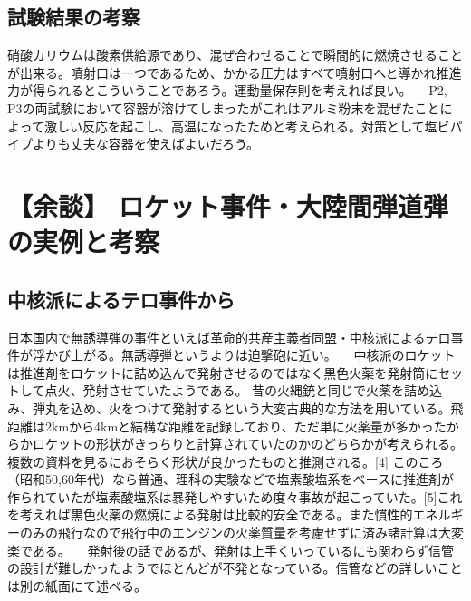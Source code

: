 \subsection{試験結果の考察}
硝酸カリウムは酸素供給源であり、混ぜ合わせることで瞬間的に燃焼させることが出来る。噴射口は一つであるため、かかる圧力はすべて噴射口へと導かれ推進力が得られるとこういうことであろう。運動量保存則を考えれば良い。
　P2, P3の両試験において容器が溶けてしまったがこれはアルミ粉末を混ぜたことによって激しい反応を起こし、高温になったためと考えられる。対策として塩ビパイプよりも丈夫な容器を使えばよいだろう。

\section{ 【余談】 ロケット事件・大陸間弾道弾の実例と考察}
\subsection{中核派によるテロ事件から}
日本国内で無誘導弾の事件といえば革命的共産主義者同盟・中核派によるテロ事件が浮かび上がる。無誘導弾というよりは迫撃砲に近い。
　中核派のロケットは推進剤をロケットに詰め込んで発射させるのではなく黒色火薬を発射筒にセットして点火、発射させていたようである。
昔の火縄銃と同じで火薬を詰め込み、弾丸を込め、火をつけて発射するという大変古典的な方法を用いている。飛距離は2kmから4kmと結構な距離を記録しており、ただ単に火薬量が多かったからかロケットの形状がきっちりと計算されていたのかのどちらかが考えられる。複数の資料を見るにおそらく形状が良かったものと推測される。[4]
このころ（昭和50,60年代）なら普通、理科の実験などで塩素酸塩系をベースに推進剤が作られていたが塩素酸塩系は暴発しやすいため度々事故が起こっていた。[5]これを考えれば黒色火薬の燃焼による発射は比較的安全である。また慣性的エネルギーのみの飛行なので飛行中のエンジンの火薬質量を考慮せずに済み諸計算は大変楽である。
　発射後の話であるが、発射は上手くいっているにも関わらず信管の設計が難しかったようでほとんどが不発となっている。信管などの詳しいことは別の紙面にて述べる。

